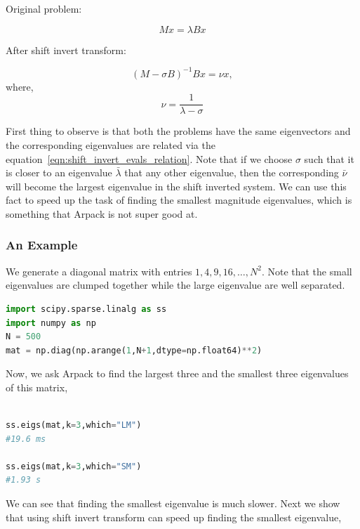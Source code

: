 \documentclass[%
 reprint,
 amsmath,amssymb,
 aps,
]{revtex4-2}
\begin{document}
Original problem:

\begin{equation}
    M x = \lambda B x
\end{equation}

After shift invert transform:

\begin{equation}
    (M - \sigma B)^{-1} B x = \nu x , 
    \label{eqn:shift_inverted_equation}
\end{equation}  
where,
\begin{equation}
    \nu = \frac{1}{\lambda - \sigma}
    \label{eqn:shift_invert_evals_relation}
\end{equation}


First thing to observe is that both the problems have the same eigenvectors and the corresponding eigenvalues are related via the equation~\ref{eqn:shift_invert_evals_relation}. Note that if we choose $\sigma$ such that it is closer to an eigenvalue $\bar{\lambda}$ that any other eigenvalue, then the corresponding $\bar{\nu}$ will become the largest eigenvalue in the shift inverted system. We can use this fact to speed up the task of finding the smallest magnitude eigenvalues, which is something that Arpack is not super good at.


\subsubsection{An Example}

We generate a diagonal matrix with entries $1,4,9,16, \ldots, N^2$.
Note that the small eigenvalues are clumped together while the large eigenvalue are well separated. 

\begin{lstlisting}[language=Python, caption=Matrix generation code]
import scipy.sparse.linalg as ss
import numpy as np
N = 500
mat = np.diag(np.arange(1,N+1,dtype=np.float64)**2)
\end{lstlisting}

Now, we ask Arpack to find the largest three and the smallest three eigenvalues of this matrix,

\begin{lstlisting}[language=Python, caption=Finding the largest eigenvalue is faster]

ss.eigs(mat,k=3,which="LM")
#19.6 ms

ss.eigs(mat,k=3,which="SM")
#1.93 s
\end{lstlisting}

We can see that finding the smallest eigenvalue is much slower. Next we show that using shift invert transform can speed up finding the smallest eigenvalue,
\end{document}
